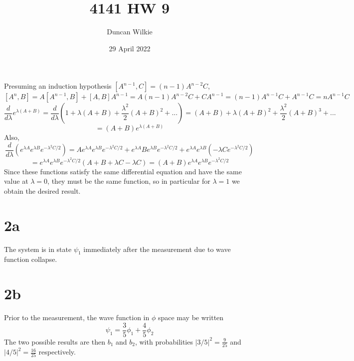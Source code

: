 \documentclass{article}
\title{4141 HW 9}
\author{Duncan Wilkie}
\date{29 April 2022}
\begin{document}
\maketitle

\section{}
Presuming an induction hypothesis $[A^{n-1},C]=(n-1)A^{n-2}C$,
\[
  [A^{n},B]=A[A^{n-1},B]+ [A,B]A^{n-1}
  =A(n-1)A^{n-2}C+CA^{n-1}
  =(n-1)A^{n-1}C+A^{n-1}C
  =nA^{n-1}C
\]
\[
  \frac{d}{d\lambda}e^{\lambda (A+B)}=\frac{d}{d\lambda}\left(  1+\lambda(A+B)+\frac{\lambda^{2}}{2}(A+B)^{2}+...\right)
  =(A+B)+\lambda (A+B)^{2}+\frac{\lambda^{2}}{2}(A+B)^{3}+...
\]
\[
  =(A+B)e^{\lambda(A+B)}
\]
Also,
\[
  \frac{d}{d\lambda}(e^{\lambda A}e^{\lambda B}e^{-\lambda^{2}C/2})
  =Ae^{\lambda A}e^{\lambda B}e^{-\lambda^{2}C/2}+e^{\lambda A}Be^{\lambda B}e^{-\lambda^{2}C/2}
  +e^{\lambda A}e^{\lambda B}\left( -\lambda Ce^{-\lambda^{2}C/2} \right)
\]
\[
  =e^{\lambda A}e^{\lambda B}e^{-\lambda^{2}C/2}\left( A+B+\lambda C-\lambda C \right)
  =(A+B)e^{\lambda A}e^{\lambda B}e^{-\lambda^{2}C/2}
\]
Since these functions satisfy the same differential equation and have the same value at $\lambda=0$, they must be the same function,
so in particular for $\lambda=1$ we obtain the desired result.

\section*{2a}
The system is in state $\psi_{1}$ immediately after the measurement due to wave function collapse.
\section*{2b}
Prior to the measurement, the wave function in $\phi$ space may be written
\[
  \psi_{1}=\frac{3}{5}\phi_{1}+\frac{4}{5}\phi_{2}
\]
The two possible results are then $b_{1}$ and $b_{2}$, with probabilities $|3/5|^{2}=\frac{9}{25}$ and $|4/5|^{2}=\frac{16}{25}$
respectively.
\end{document}
